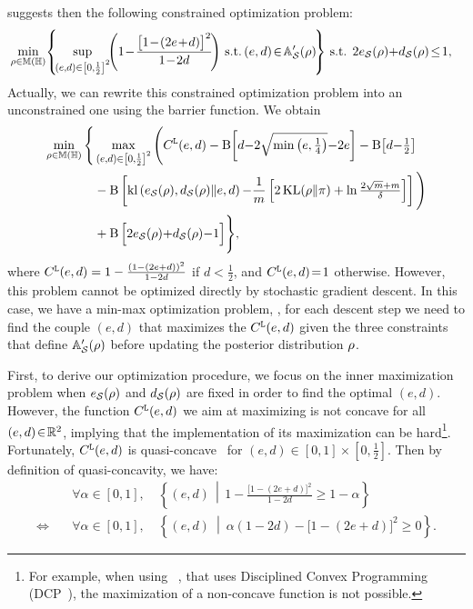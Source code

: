  suggests then the following constrained optimization problem: 
\begin{align*}
    &\min_{\Q\in\M(\H)}\!\left\{\! \sup_{\scalebox{0.8}{$(e{,}d){\in}\!\LB0,\!\tfrac{1}{2}\RB^2$}}\!\!
    \LP 1\!-\! \frac{\big[ 1\!-\!(2e\!+\!d)\big]^2}{1\!-\!2d}\! \RP\,   \text{s.t.}\,  (e, d)\! \in\! \Abb'_{\dS}(\Q) \! \right\} \!\text{ s.t. } 2e_{\dS}(\Q){+}d_{\dS}(\Q)\!\le\! 1,
\end{align*}
Actually, we can rewrite this constrained optimization problem into an unconstrained one using the barrier function. 
We obtain
\begin{align}
    \min_{\Q\in\M(\H)} \Bigg\{&\max_{\scalebox{0.8}{$(e{,}d){\in}\!\LB0,\!\tfrac{1}{2}\RB^2$}}  \Bigg(
     \CBound^{\tt L}(e,d) - \logbar\!\LB d {-} 2\sqrt{\min\LP e, \tfrac{1}{4}\RP}{-}2e\RB -\logbar\!\LB d{-}\tfrac{1}{2}\RB \nonumber\\
     &- \logbar\LB\kl\LP e_{\dS}(\Q),  d_{\dS}(\Q)\|e, d\RP{-}\frac{1}{\m}\LB 2\KL(\Q\|\P) + \ln\tfrac{2\sqrt{\m}+\m}{\delta}\RB\RB
   \Bigg)\nonumber\\
   &+ \logbar\Big[ 2e_{\dS}(\Q){+}d_{\dS}(\Q){-}1\Big]\Bigg\}, \label{eq:k_Q_param_nu}
\end{align}
where ${C}^{\tt L}(e,d)=1-\tfrac{\left( 1-(2e+d)\right)^2}{1-2d}$ if $d\!<\!\frac12$, and ${C}^{\tt L}(e,d)\!=\!1$ otherwise.
However, this problem cannot be optimized directly by stochastic gradient descent.
In this case, we have a \mbox{min-max} optimization problem, \ie, for each descent step we need to find the couple $(e, d)$ that maximizes the ${C}^{\tt L}(e,d)$ given the three constraints that define $\mathbb{A}'_{\mathcal{S}}(\rho)$ before updating the posterior distribution $\rho$.

First, to derive our optimization procedure, we focus on the inner maximization problem when $e_{\mathcal{S}}(\rho)$ and $d_{\mathcal{S}}(\rho)$ are fixed in order to find the optimal $(e,d)$.
However, the function ${C}^{\tt L}(e,d)$ we aim at maximizing is not concave for all $(e,d)\!\in\!\mathbb{R}^2$, implying that the  implementation of its maximization can be hard\footnote{For example, when using \cvxpy~\citep{DiamondBoyd2016}, that uses Disciplined Convex Programming (DCP~\citep{GrantBoydYe2006}), the maximization of a non-concave function is not possible.}. 
Fortunately, ${C}^{\tt L}(e,d)$ is quasi-concave~\citep{GermainLacasseLavioletteMarchandRoy2015} for $(e, d)\in[0, 1]\times[0, \frac{1}{2}]$.
Then by  definition of quasi-concavity, we have:
\begin{align*}
&\forall \alpha\in [0,1],\quad \left\{ (e, d) \,\middle|\, 1- \frac{\big[ 1-(2e+d)\big]^2}{1-2d} \ge 1-\alpha \right\}\\
\Longleftrightarrow\quad  &\forall \alpha\in [0,1],\quad  \left\{ (e, d) \ \middle|\  
\alpha(1{-}2d)-\Big[1{-}(2e{+}d)\Big]^2 \ge 0\right\}.
\end{align*}

